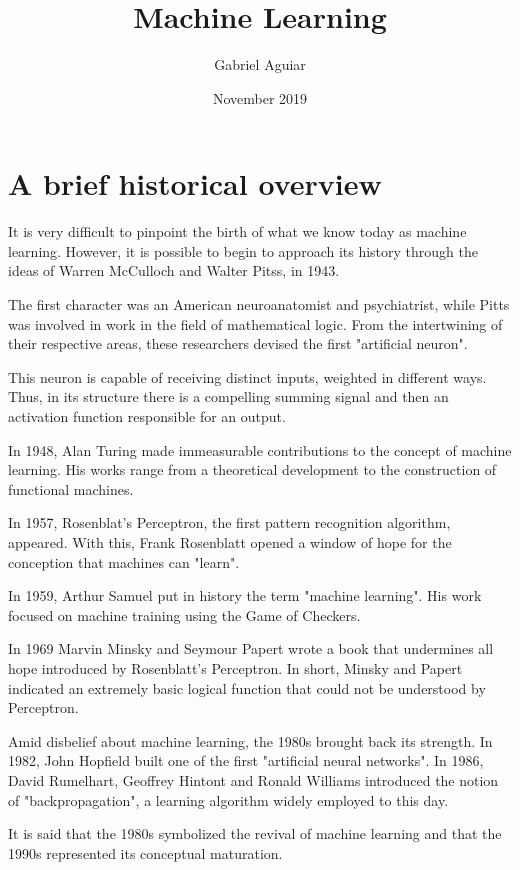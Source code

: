 \documentclass{article}
\title{Machine Learning}
\author{Gabriel Aguiar}
\date{November 2019}
\begin{document}
\maketitle

\section{A brief historical overview}

It is very difficult to pinpoint the birth of what we know today as machine learning. However, it is possible to begin to approach its history through the ideas of Warren McCulloch and Walter Pitss, in 1943.

\hfill

The first character was an American neuroanatomist and psychiatrist, while Pitts was involved in work in the field of mathematical logic. From the intertwining of their respective areas, these researchers devised the first "artificial neuron".

\hfill

This neuron is capable of receiving distinct inputs, weighted in different ways. Thus, in its structure there is a compelling summing signal and then an activation function responsible for an output.

\hfill

In 1948, Alan Turing made immeasurable contributions to the concept of machine learning. His works range from a theoretical development to the construction of functional machines.

\hfill

In 1957, Rosenblat's Perceptron, the first pattern recognition algorithm, appeared. With this, Frank Rosenblatt opened a window of hope for the conception that machines can "learn".

\hfill

In 1959, Arthur Samuel put in history the term "machine learning". His work focused on machine training using the Game of Checkers.

\hfill

In 1969 Marvin Minsky and Seymour Papert wrote a book that undermines all hope introduced by Rosenblatt's Perceptron. In short, Minsky and Papert indicated an extremely basic logical function that could not be understood by Perceptron.

\hfill

Amid disbelief about machine learning, the 1980s brought back its strength. In 1982, John Hopfield built one of the first "artificial neural networks". In 1986, David Rumelhart, Geoffrey Hintont and Ronald Williams introduced the notion of "backpropagation", a learning algorithm widely employed to this day.

\hfill

It is said that the 1980s symbolized the revival of machine learning and that the 1990s represented its conceptual maturation.
\end{document}

